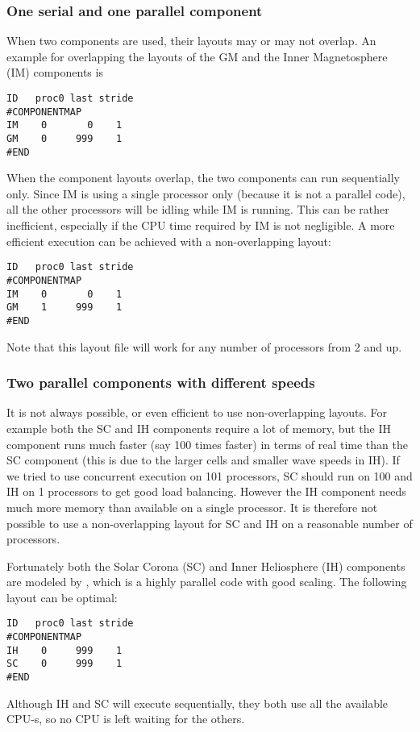 \subsubsection{One serial and one parallel component}

When two components are used, their layouts may or may not overlap.
An example for overlapping the layouts of the GM and the
Inner Magnetosphere (IM) components is
\begin{verbatim}
ID   proc0 last stride
#COMPONENTMAP
IM    0       0    1
GM    0     999    1
#END
\end{verbatim}
When the component layouts overlap, the two components can run
sequentially only. Since IM is using a single processor only
(because it is not a parallel code), all the other processors 
will be idling while IM is running. This can be rather inefficient,
especially if the CPU time required by IM is not negligible.
A more efficient execution can be achieved with a non-overlapping layout:
\begin{verbatim}
ID   proc0 last stride
#COMPONENTMAP
IM    0       0    1
GM    1     999    1
#END
\end{verbatim}
Note that this layout file will work for any number 
of processors from 2 and up.

\subsubsection{Two parallel components with different speeds}

It is not always possible, or even efficient to use non-overlapping
layouts. For example both the SC and IH components require a lot of memory,
but the IH component runs much faster (say 100 times faster) 
in terms of real time than the SC component (this is due to the 
larger cells and smaller wave speeds in IH).
If we tried to use concurrent execution on 101 processors,
SC should run on 100 and IH on 1 processors to get good load balancing.
However the IH component needs much more memory than available
on a single processor. It is therefore not possible to use a non-overlapping
layout for SC and IH on a reasonable number of processors.

Fortunately both the Solar Corona (SC) and Inner Heliosphere (IH)
components are modeled by \BATSRUS, which is a highly parallel code
with good scaling. The following layout can be optimal:
\begin{verbatim}
ID   proc0 last stride
#COMPONENTMAP
IH    0     999    1
SC    0     999    1
#END
\end{verbatim}
Although IH and SC will execute sequentially, they both
use all the available CPU-s, so no CPU is left waiting for the others.

